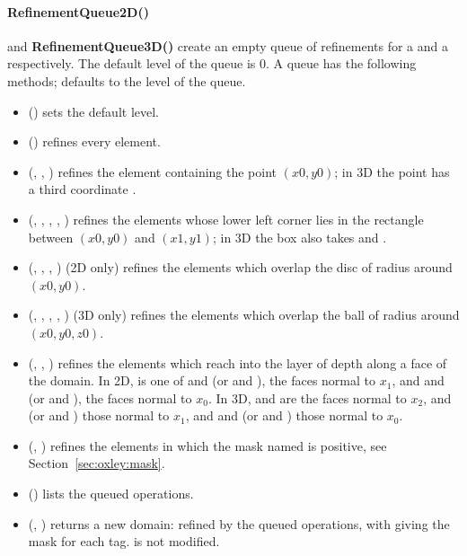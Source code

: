 \paragraph{RefinementQueue2D()} and \textbf{RefinementQueue3D()}
create an empty queue of refinements for a  and a
 respectively. The default level of the queue is $0$. A queue
has the following methods;  defaults to the level of the queue.
\begin{itemize}
\item {}() sets the default level.
\item {}() refines every element.
\item {}(, , ) refines the
element containing the point $(x0,y0)$; in 3D the point has a third
coordinate .
\item {}(, , , ,
) refines the elements whose lower left corner lies in the
rectangle between $(x0,y0)$ and $(x1,y1)$; in 3D the box also takes
 and .
\item {}(, , , )
(2D only) refines the elements which overlap the disc of radius 
around $(x0,y0)$.
\item {}(, , , ,
) (3D only) refines the elements which overlap the ball of radius
 around $(x0,y0,z0)$.
\item {}(, , ) refines the
elements which reach into the layer of depth  along a face of the
domain. In 2D,  is one of  and  (or
 and ), the faces normal to $x_1$, and
 and  (or  and ), the
faces normal to $x_0$. In 3D,  and  are the faces
normal to $x_2$,  and  (or  and
) those normal to $x_1$, and  and  (or
 and ) those normal to $x_0$.
\item {}(, ) refines the elements in
which the mask named  is positive, see
Section~\ref{sec:oxley:mask}.
\item {}() lists the queued operations.
\item {}(, ) returns a new domain:
 refined by the queued operations, with  giving the
mask for each tag.  is not modified.
\end{itemize}

